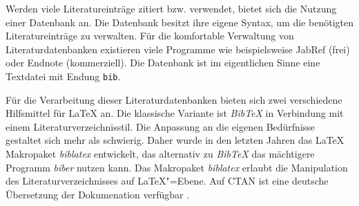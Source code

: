 Werden viele Literatureinträge zitiert bzw. verwendet, bietet sich die Nutzung
einer Datenbank an. Die Datenbank besitzt ihre eigene Syntax,
um die benötigten Literatureinträge zu verwalten. Für die komfortable Verwaltung
von Literaturdatenbanken existieren viele Programme wie beispielsweise JabRef (frei) oder
Endnote (kommerziell). Die Datenbank ist im eigentlichen Sinne eine Textdatei mit
Endung \lstinline|bib|. 


Für die Verarbeitung dieser Literaturdatenbanken bieten sich zwei verschiedene 
Hilfsmittel für \LaTeX{} an. Die klassische Variante ist \emph{Bib\TeX} in Verbindung
mit einem Literaturverzeichnisstil. Die Anpassung an die eigenen Bedürfnisse
gestaltet sich mehr als schwierig. Daher wurde in den letzten Jahren das \LaTeX{} 
Makropaket \emph{biblatex} entwickelt, das alternativ zu \emph{Bib\TeX} das mächtigere
Programm \emph{biber} nutzen kann. Das Makropaket \emph{biblatex} erlaubt die Manipulation
des Literaturverzeichnisses auf \LaTeX"=Ebene. Auf CTAN ist eine deutsche Übersetzung der Dokumenation
verfügbar \cite{biblatex-de}.

\endinput
